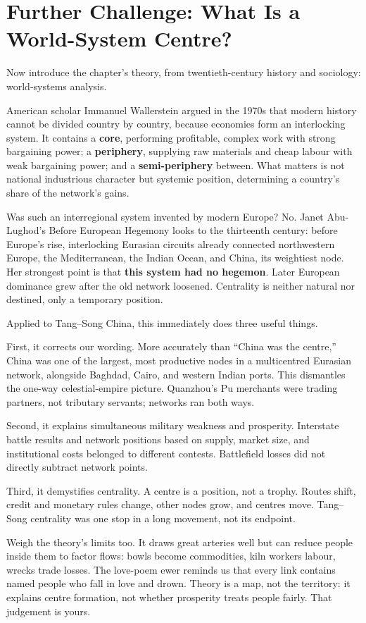 \section[World-System Centres]{Further Challenge: What Is a World-System Centre?}
Now introduce the chapter's theory, from twentieth-century history and sociology: world-systems analysis.

American scholar Immanuel Wallerstein argued in the 1970s that modern history cannot be divided country by country, because economies form an interlocking system. It contains a \textbf{core}, performing profitable, complex work with strong bargaining power; a \textbf{periphery}, supplying raw materials and cheap labour with weak bargaining power; and a \textbf{semi-periphery} between. What matters is not national industrious character but systemic position, determining a country's share of the network's gains.

Was such an interregional system invented by modern Europe? No. Janet Abu-Lughod's Before European Hegemony looks to the thirteenth century: before Europe's rise, interlocking Eurasian circuits already connected northwestern Europe, the Mediterranean, the Indian Ocean, and China, its weightiest node. Her strongest point is that \textbf{this system had no hegemon}. Later European dominance grew after the old network loosened. Centrality is neither natural nor destined, only a temporary position.

Applied to Tang--Song China, this immediately does three useful things.

First, it corrects our wording. More accurately than ``China was the centre,'' China was one of the largest, most productive nodes in a multicentred Eurasian network, alongside Baghdad, Cairo, and western Indian ports. This dismantles the one-way celestial-empire picture. Quanzhou's Pu merchants were trading partners, not tributary servants; networks ran both ways.

Second, it explains simultaneous military weakness and prosperity. Interstate battle results and network positions based on supply, market size, and institutional costs belonged to different contests. Battlefield losses did not directly subtract network points.

Third, it demystifies centrality. A centre is a position, not a trophy. Routes shift, credit and monetary rules change, other nodes grow, and centres move. Tang--Song centrality was one stop in a long movement, not its endpoint.

Weigh the theory's limits too. It draws great arteries well but can reduce people inside them to factor flows: bowls become commodities, kiln workers labour, wrecks trade losses. The love-poem ewer reminds us that every link contains named people who fall in love and drown. Theory is a map, not the territory: it explains centre formation, not whether prosperity treats people fairly. That judgement is yours.

